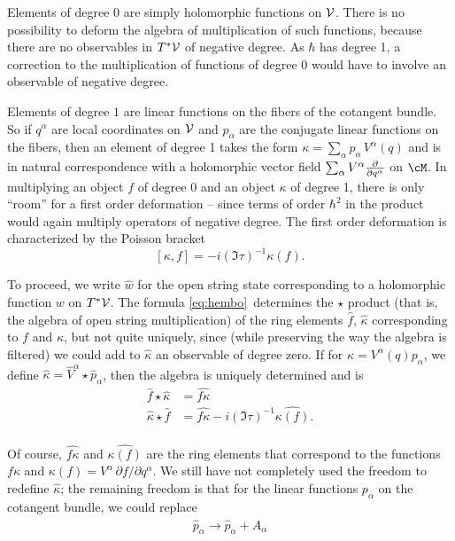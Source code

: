 Elements of degree $0$ are simply holomorphic functions on ${{\cal
V}}$.  There is no possibility to deform the algebra of
multiplication of such functions, because there are no observables
in $T^*{{\cal V}}$ of negative degree.  As $\hbar$ has degree 1, a
correction to the multiplication of functions of degree 0 would
have to involve an observable of negative degree.

Elements of degree $1$ are linear functions on the fibers of the
cotangent bundle.  So if $q^\alpha$ are local coordinates on
${{\cal V}}$ and $p_\alpha$ are the conjugate linear functions on
the fibers, then an element of degree 1 takes the form
$\kappa=\sum_\alpha p_\alpha\, V^\alpha(q)$ and is in natural
correspondence with a holomorphic vector field $\sum_\alpha
V^\alpha{\partial\over\partial q^\alpha}$ on $\cM$. In multiplying
an object $f$ of degree $0$ and an object $\kappa$ of degree 1,
there is only ``room'' for a first order deformation -- since
terms of order $\hbar^2$ in the product would again multiply
operators of negative degree. The first order deformation is
characterized by the Poisson bracket %
\setcounter{equation}{11}
\begin{equation}\label{eq:hembo}
[\kappa,
f]=-i(\Im\tau)^{-1}\kappa(f).
\end{equation}

To proceed, we write $\hat w$ for the open string state
corresponding to a holomorphic function $w$ on $T^*{{\cal V}}$.
The formula \eqref{eq:hembo}\ determines the $\star$ product (that is, the
algebra of open string multiplication) of the ring elements $\hat
f$, $\hat\kappa$ corresponding to $f$ and $\kappa$, but not quite
uniquely, since (while preserving the way the algebra is filtered)
we could add to $\hat\kappa$ an observable of degree zero. If for
$\kappa=V^\alpha(q) p_\alpha$, we define $\hat\kappa =\hat
V^\alpha\star \hat p_\alpha$, then the algebra is uniquely
determined and is %
\setcounter{equation}{12}
\begin{equation}\label{eq:yembo}
\begin{aligned}\hat f\star\hat\kappa&
=\hat{f\kappa}\\ \hat\kappa\star \hat f&
 =\hat{f\kappa}-i(\Im\tau)^{-1}\hat{\kappa(f)}.\\\end{aligned}
\end{equation}

 Of course, $\hat{ f\kappa}$ and $\hat{\kappa(f)}$ are the ring
 elements that correspond to the functions
 $f\kappa$ and $\kappa(f)=V^\alpha\,\partial f/\partial
q^\alpha$. We still have not completely used the freedom to
redefine $\hat\kappa$; the remaining freedom is that for the
linear functions $p_\alpha$ on the cotangent bundle, we could
replace %
\setcounter{equation}{13}
\begin{equation}\label{eq:remob}
\hat p_\alpha\to \hat p_\alpha+\hat A_\alpha
\end{equation}

